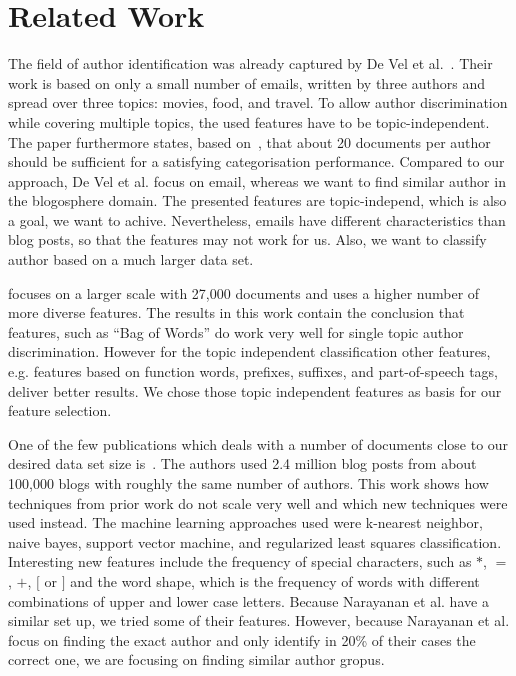 
\section{Related Work}
\label{sec:related}


The field of author identification was already captured by De Vel et al.~\cite{de2001mining}.
Their work is based on only a small number of emails, written by three authors and spread over three topics: movies, food, and travel.
To allow author discrimination while covering multiple topics, the used features have to be topic-independent.
The paper furthermore states, based on~\cite{corney2001identifying}, that about 20 documents per author should be sufficient for a satisfying categorisation performance.
Compared to our approach, De Vel et al. focus on email, whereas we want to find similar author in the blogosphere domain.
The presented features are topic-independ, which is also a goal, we want to achive.
Nevertheless, emails have different characteristics than blog posts, so that the features may not work for us.
Also, we want to classify author based on a much larger data set.


\cite{madigan2005author} focuses on a larger scale with 27,000 documents and uses a higher number of more diverse features.
The results in this work contain the conclusion that features, such as ``Bag of Words'' do work very well for single topic author discrimination.
However for the topic independent classification other features, e.g. features based on function words, prefixes, suffixes, and part-of-speech tags, deliver better results.
We chose those topic independent features as basis for our feature selection.


One of the few publications which deals with a number of documents close to our desired data set size is~\cite{narayanan2012feasibility}.
The authors used 2.4 million blog posts from about 100,000 blogs with roughly the same number of authors.
This work shows how techniques from prior work do not scale very well and which new techniques were used instead.
The machine learning approaches used were k-nearest neighbor, naive bayes, support vector machine, and regularized least squares classification.
Interesting new features include the frequency of special characters, such as $*$, $=$, $+$, $[$ or $]$ and the word shape, which is the frequency of words with different combinations of upper and lower case letters.
Because Narayanan et al. have a similar set up, we tried some of their features.
However, because Narayanan et al. focus on finding the exact author and only identify in 20\% of their cases the correct one, we are focusing on finding similar author gropus.


